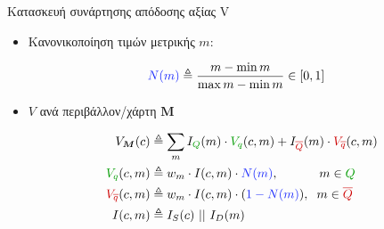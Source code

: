\begin{frame}{Κατασκευή συνάρτησης απόδοσης αξίας V}


  \begin{itemize}
    \item Κανονικοποίηση τιμών μετρικής $m$:

          \begin{align}
            \textcolor{b}{N(m)} &\triangleq \dfrac{m - \min m}{\max m - \min m} \in [0,1] \nonumber
          \end{align}

    \item $V$ ανά περιβάλλον/χάρτη $\bm{M}$

          \begin{align}
            V_{\bm{M}}(c) &\triangleq \sum\limits_{m} I_{\textcolor{g}{Q}}(m) \cdot \textcolor{g}{V_q}(c,m) + I_{\textcolor{r}{\overline{Q}}}(m) \cdot \textcolor{r}{V_{\overline{q}}}(c,m) \nonumber \\
            \textcolor{g}{V_q}(c,m) &\triangleq  w_m \cdot I(c,m) \cdot \textcolor{b}{N(m)}, \hspace{1.15cm} m \in \textcolor{g}{Q}\nonumber \\
            \textcolor{r}{V_{\overline{q}}}(c,m) &\triangleq  w_m \cdot I(c,m) \cdot( \textcolor{b}{1 - N(m)}), \hspace{0.2cm} m \in \textcolor{r}{\overline{Q}} \nonumber \\
            I(c,m) &\triangleq I_S(c)\ ||\ I_D(m) \nonumber
          \end{align}

  \end{itemize}


\end{frame}
